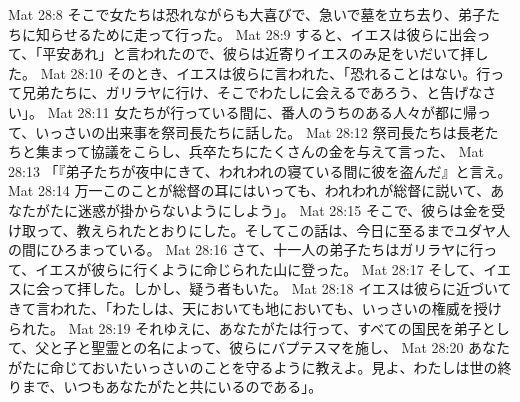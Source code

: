 Mat 28:8  そこで女たちは恐れながらも大喜びで、急いで墓を立ち去り、弟子たちに知らせるために走って行った。
Mat 28:9  すると、イエスは彼らに出会って、「平安あれ」と言われたので、彼らは近寄りイエスのみ足をいだいて拝した。
Mat 28:10  そのとき、イエスは彼らに言われた、「恐れることはない。行って兄弟たちに、ガリラヤに行け、そこでわたしに会えるであろう、と告げなさい」。
Mat 28:11  女たちが行っている間に、番人のうちのある人々が都に帰って、いっさいの出来事を祭司長たちに話した。
Mat 28:12  祭司長たちは長老たちと集まって協議をこらし、兵卒たちにたくさんの金を与えて言った、
Mat 28:13  「『弟子たちが夜中にきて、われわれの寝ている間に彼を盗んだ』と言え。
Mat 28:14  万一このことが総督の耳にはいっても、われわれが総督に説いて、あなたがたに迷惑が掛からないようにしよう」。
Mat 28:15  そこで、彼らは金を受け取って、教えられたとおりにした。そしてこの話は、今日に至るまでユダヤ人の間にひろまっている。
Mat 28:16  さて、十一人の弟子たちはガリラヤに行って、イエスが彼らに行くように命じられた山に登った。
Mat 28:17  そして、イエスに会って拝した。しかし、疑う者もいた。
Mat 28:18  イエスは彼らに近づいてきて言われた、「わたしは、天においても地においても、いっさいの権威を授けられた。
Mat 28:19  それゆえに、あなたがたは行って、すべての国民を弟子として、父と子と聖霊との名によって、彼らにバプテスマを施し、
Mat 28:20  あなたがたに命じておいたいっさいのことを守るように教えよ。見よ、わたしは世の終りまで、いつもあなたがたと共にいるのである」。


